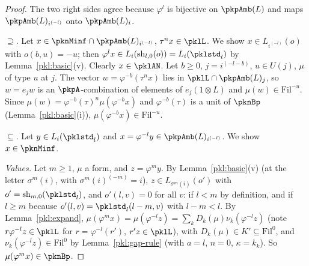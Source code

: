 \documentclass[10pt]{amsart}
\theoremstyle{definition}
\theoremstyle{remark}
\begin{document}
\begin{proof}
The two right sides agree because $\varphi^l$ is bijective on $\pkpAmb(L)$ and maps $\pkpAmb(L)_{i^{(-l)}}$ onto
$\pkpAmb(L)_i$.

$\supseteq$. Let $x\in\pknMinf\cap\pkpAmb(L)_{i^{(-l)}}$, $\tau^nx\in\pklL$. We show $x\in L_{i^{(-l)}}(o)$ with
$o(b,u)=-u$; then $\varphi^lx\in L_i(\mathrm{sh}_{l,0}(o))=L_i(\pklstd_l)$ by Lemma~\ref{pkl:basic}(v). Clearly
$x\in\pklAN$. Let $b\ge0$, $j=i^{(-l-b)}$, $u\in U(j)$, $\mu$ of type $u$ at $j$. The vector
$w=\varphi^{-b}(\tau^nx)$ lies in $\pklL\cap\pkpAmb(L)_j$, so $w=e_jw$ is an $\pkpA$-combination of elements of
$e_j(1\otimes L)$ and $\mu(w)\in\mathrm{Fil}^{-u}$. Since $\mu(w)=\varphi^{-b}(\tau)^n\mu(\varphi^{-b}x)$ and
$\varphi^{-b}(\tau)$ is a unit of $\pknBp$ (Lemma~\ref{pkl:basic}(i)), $\mu(\varphi^{-b}x)\in\mathrm{Fil}^{-u}$.

$\subseteq$. Let $y\in L_i(\pklstd_l)$ and $x=\varphi^{-l}y\in\pkpAmb(L)_{i^{(-l)}}$. We show $x\in\pknMinf$.

\emph{Values.} Let $m\ge1$, $\mu$ a form, and $z=\varphi^my$. By Lemma~\ref{pkl:basic}(v) (at the letter
$\sigma^m(i)$, with $\sigma^m(i)^{(-m)}=i$), $z\in L_{\sigma^m(i)}(o')$ with $o'=\mathrm{sh}_{m,0}(\pklstd_l)$,
and $o'(l,v)=0$ for all $v$: if $l<m$ by definition, and if $l\ge m$ because $o'(l,v)=\pklstd_l(l-m,v)$ with
$l-m<l$. By Lemma~\ref{pkl:expand}, $\mu(\varphi^mx)=\mu(\varphi^{-l}z)=\sum_kD_k(\mu)\nu_k(\varphi^{-l}z)$ (note
$r\varphi^{-l}z\in\pklL$ for $r=\varphi^{-l}(r')$, $r'z\in\pklL$), with $D_k(\mu)\in K'\subseteq\mathrm{Fil}^0$, and
$\nu_k(\varphi^{-l}z)\in\mathrm{Fil}^0$ by Lemma~\ref{pkl:gap-rule} (with $a=l$, $n=0$, $\kappa=k_k$). So
$\mu(\varphi^mx)\in\pknBp$.


\end{proof}
\end{document}
